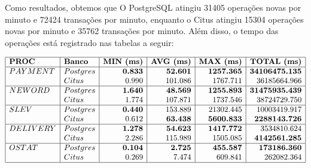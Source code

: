 Como resultados, obtemos que O PostgreSQL atingiu 31405 operações novas por minuto e 72424 transações por minuto, 
enquanto o Citus atingiu 15304 operações novas por minuto e 35762 transações por minuto.
Além disso, o tempo das operações está registrado nas tabelas a seguir:

\[
\begin{array}{|l|l|r|r|r|r|}
\hline
\textbf{PROC} & \textbf{Banco} & \textbf{MIN (ms)} & \textbf{AVG (ms)} & \textbf{MAX (ms)} & \textbf{TOTAL (ms)} \\
\hline
PAYMENT & Postgres & \textbf{0.833} & \textbf{52.601} & \textbf{1257.365} & \textbf{34106475.135} \\
        & Citus    & 0.990          & 101.086         & 1767.711          & 36185664.966         \\
\hline
NEWORD  & Postgres & \textbf{1.640} & \textbf{48.569} & \textbf{1255.893} & \textbf{31475935.439} \\
        & Citus    & 1.774          & 107.871         & 1737.546          & 38724729.750         \\
\hline
SLEV    & Postgres & \textbf{0.440} & 153.889         & 21302.445         & 10003419.917         \\
        & Citus    & 0.612          & \textbf{63.438} & \textbf{5600.833} & \textbf{2288143.726} \\
\hline
DELIVERY& Postgres & \textbf{1.278} & \textbf{54.623} & \textbf{1417.772} & 3534810.624          \\
        & Citus    & 2.286          & 115.989         & 1505.085          & \textbf{4142561.285} \\
\hline
OSTAT   & Postgres & \textbf{0.104} & \textbf{2.725}  & \textbf{455.587}  & \textbf{173186.360}  \\
        & Citus    & 0.269          & 7.474           & 609.841           & 262082.364           \\
\hline
\end{array}
\]


